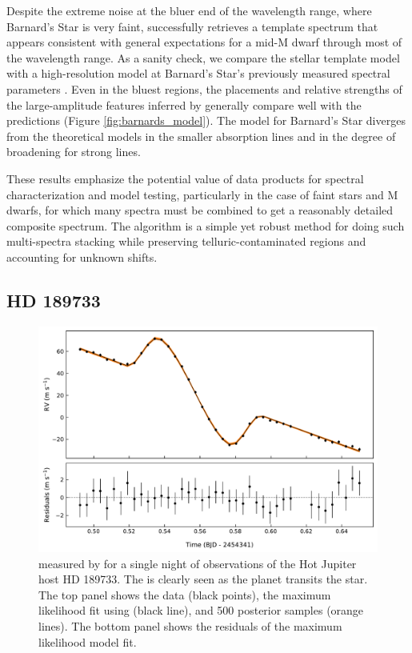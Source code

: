 \documentclass[twocolumn]{aastex62}
\newcommand{\Mdwarf}{Barnard's Star\xspace} %
\begin{document}
Despite the extreme noise at the bluer end of the wavelength range, where \Mdwarf is very faint, \wobble successfully retrieves a template spectrum that appears consistent with general expectations for a mid-M dwarf through most of the \HARPS wavelength range. 
As a sanity check, we compare the \wobble stellar template model with a high-resolution \PHOENIX model at \Mdwarf's previously measured spectral parameters \citep[\teff = 3200 K, \logg = 5.0, and \mh = $-0.5$;][and references therein]{Husser2013, Artigau2018}. 
Even in the bluest regions, the placements and relative strengths of the large-amplitude features inferred by \wobble generally compare well with the \PHOENIX predictions (Figure \ref{fig:barnards_model}). 
The \wobble model for \Mdwarf diverges from the theoretical models in the smaller absorption lines and in the degree of broadening for strong lines.  

These results emphasize the potential value of \wobble data products for spectral characterization and model testing, particularly in the case of faint stars and M dwarfs, for which many spectra must be combined to get a reasonably detailed composite spectrum. 
The \wobble algorithm is a simple yet robust method for doing such multi-spectra stacking while preserving telluric-contaminated regions and accounting for unknown \RV shifts.

\subsection{HD 189733}

\begin{figure}
\centering
\includegraphics[width=6in]{hd189_rm}
\caption{\RVs measured by \wobble for a single night of observations of the Hot 
         Jupiter host HD 189733. The \RM is clearly seen as the planet transits 
         the star. The top panel shows the data (black points), the maximum
         likelihood fit using \starry (black line), and 500 posterior samples
         (orange lines). The bottom panel shows the residuals of the maximum
         likelihood model fit.}
\label{fig:hd189_rm}
\end{figure}
\end{document}
